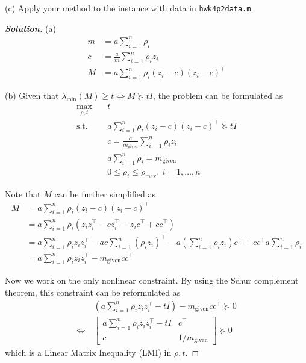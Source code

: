 \documentclass[11pt]{article}
\newenvironment{solution}
  {\renewcommand\qedsymbol{$\square$}\begin{proof}[\textbf{Solution}]}
  {\end{proof}}
\newcommand{\T}{^\top}
\begin{document}
(c) Apply your method to the instance with data in \texttt{hwk4p2data.m}.


\begin{solution}
  (a) 
  \begin{align*}
    m &= a\sum_{i=1}^{n} \rho_i\\
    c &= \frac{a}{m} \sum_{i=1}^{n} \rho_i z_i\\
    M &= a \sum_{i=1}^{n} \rho_i (z_i - c) (z_i - c)\T
  \end{align*}

  (b) Given that $\lambda_{\min}(M) \geq t \Leftrightarrow M \succeq tI$, the problem can be formulated as
  \begin{align*}
    \max_{\rho, t} \quad & t\\
    \text{s.t.}\quad 
    & a \sum_{i=1}^{n} \rho_i (z_i - c) (z_i - c)\T \succeq tI\\
    & c = \frac{a}{m_{\text{given}}} \sum_{i=1}^{n} \rho_i z_i\\
    & a\sum_{i=1}^{n} \rho_i = m_{\text{given}}\\
    & 0 \leq \rho_i \leq \rho_{\max},\ i=1, \dots, n
  \end{align*}

  Note that $M$ can be further simplified as
  \begin{align*}
    M 
    &=  a \sum_{i=1}^{n} \rho_i (z_i - c) (z_i - c)\T\\
    &= a \sum_{i=1}^{n} \rho_i (z_i z_i\T -c z_i\T -z_i c\T + cc\T)\\
    &= a \sum_{i=1}^{n} \rho_i z_i z_i\T - a c \sum_{i=1}^{n} (\rho_i z_i)\T - a (\sum_{i=1}^{n} \rho_i z_i)c\T + cc\T a \sum_{i=1}^{n} \rho_i\\
    &= a \sum_{i=1}^{n} \rho_i z_i z_i\T - m_{\text{given}} cc\T
  \end{align*}

  Now we work on the only nonlinear constraint. By using the Schur complement theorem, this constraint can be reformulated as
  \begin{align*}
    &(a \sum_{i=1}^{n} \rho_i z_i z_i\T - tI) - m_{\text{given}} cc\T \succeq 0\\
    \Leftrightarrow\  &\begin{bmatrix}
      a \sum_{i=1}^{n} \rho_i z_i z_i\T - tI & c\T\\
      c & 1/m_{\text{given}}
    \end{bmatrix}
    \succeq 0
  \end{align*}
  which is a Linear Matrix Inequality (LMI) in $\rho, t$.


\end{solution}
\end{document}
